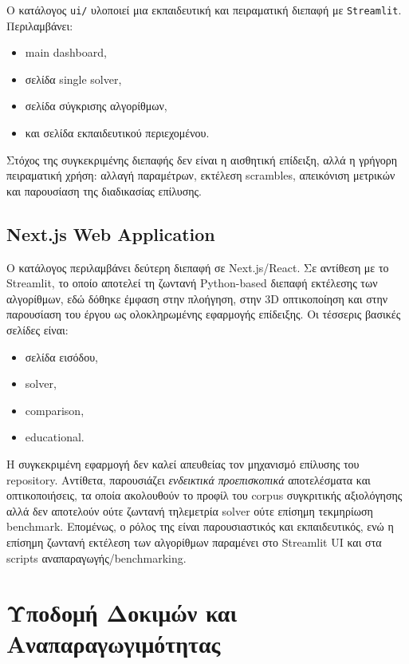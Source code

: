 Ο κατάλογος \texttt{ui/} υλοποιεί μια εκπαιδευτική και πειραματική διεπαφή με \texttt{Streamlit}. Περιλαμβάνει:
\begin{itemize}
    \item main dashboard,
    \item σελίδα single solver,
    \item σελίδα σύγκρισης αλγορίθμων,
    \item και σελίδα εκπαιδευτικού περιεχομένου.
\end{itemize}

Στόχος της συγκεκριμένης διεπαφής δεν είναι η αισθητική επίδειξη, αλλά η γρήγορη πειραματική χρήση: αλλαγή παραμέτρων, εκτέλεση scrambles, απεικόνιση μετρικών και παρουσίαση της διαδικασίας επίλυσης.

\subsection{Next.js Web Application}

Ο κατάλογος  περιλαμβάνει δεύτερη διεπαφή σε Next.js/React. Σε αντίθεση με το Streamlit, το οποίο αποτελεί τη ζωντανή Python-based διεπαφή εκτέλεσης των αλγορίθμων, εδώ δόθηκε έμφαση στην πλοήγηση, στην 3D οπτικοποίηση και στην παρουσίαση του έργου ως ολοκληρωμένης εφαρμογής επίδειξης. Οι τέσσερις βασικές σελίδες είναι:
\begin{itemize}
    \item σελίδα εισόδου,
    \item solver,
    \item comparison,
    \item educational.
\end{itemize}

Η συγκεκριμένη εφαρμογή δεν καλεί απευθείας τον μηχανισμό επίλυσης του repository. Αντίθετα, παρουσιάζει \emph{ενδεικτικά προεπισκοπικά} αποτελέσματα και οπτικοποιήσεις, τα οποία ακολουθούν το προφίλ του corpus συγκριτικής αξιολόγησης αλλά δεν αποτελούν ούτε ζωντανή τηλεμετρία solver ούτε επίσημη τεκμηρίωση benchmark. Επομένως, ο ρόλος της είναι παρουσιαστικός και εκπαιδευτικός, ενώ η επίσημη ζωντανή εκτέλεση των αλγορίθμων παραμένει στο Streamlit UI και στα scripts αναπαραγωγής/benchmarking.

\section{Υποδομή Δοκιμών και Αναπαραγωγιμότητας}

